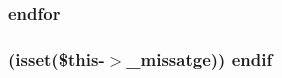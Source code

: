 \subsubsection[{endfor}]{\setlength{\rightskip}{0pt plus 5cm}endfor}\label{header_8php_ae8fdc27183f296411bac00ed522ee1ac}
\hypertarget{header_8php_a2f576def868d9b1e442c2042a246de2a}{}
\subsubsection[{endif}]{ (isset(\$this-\/$>$\+\_\+missatge)) endif}\label{header_8php_a2f576def868d9b1e442c2042a246de2a}

